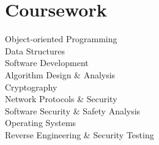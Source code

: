 
\section{Coursework}


%
%
Object-oriented Programming \\
Data Structures \\
Software Development \\
Algorithm Design \& Analysis \\
%
Cryptography \\
Network Protocols \& Security \\
Software Security \& Safety Analysis \\
%
Operating Systems \\
Reverse Engineering \& Security Testing \\
%


\sectionspace %